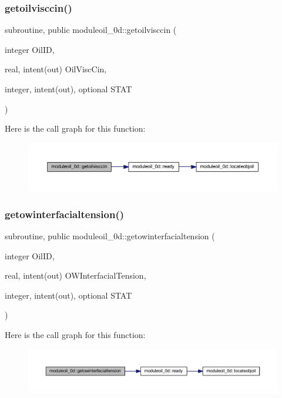 \subsubsection{\texorpdfstring{getoilvisccin()}{getoilvisccin()}}
{\footnotesize\ttfamily subroutine, public moduleoil\+\_\+0d\+::getoilvisccin (\begin{DoxyParamCaption}\item[{integer}]{Oil\+ID,  }\item[{real, intent(out)}]{Oil\+Visc\+Cin,  }\item[{integer, intent(out), optional}]{S\+T\+AT }\end{DoxyParamCaption})}

Here is the call graph for this function\+:\nopagebreak
\begin{figure}[H]
\begin{center}
\leavevmode
\includegraphics[width=350pt]{namespacemoduleoil__0d_a6049ae3704910b8c95b19beb79419be6_cgraph}
\end{center}
\end{figure}
\mbox{\label{namespacemoduleoil__0d_a07a5b422ec6e58c220beb82777c68f30}} 
\subsubsection{\texorpdfstring{getowinterfacialtension()}{getowinterfacialtension()}}
{\footnotesize\ttfamily subroutine, public moduleoil\+\_\+0d\+::getowinterfacialtension (\begin{DoxyParamCaption}\item[{integer}]{Oil\+ID,  }\item[{real, intent(out)}]{O\+W\+Interfacial\+Tension,  }\item[{integer, intent(out), optional}]{S\+T\+AT }\end{DoxyParamCaption})}

Here is the call graph for this function\+:\nopagebreak
\begin{figure}[H]
\begin{center}
\leavevmode
\includegraphics[width=350pt]{namespacemoduleoil__0d_a07a5b422ec6e58c220beb82777c68f30_cgraph}
\end{center}
\end{figure}
\mbox{\label{namespacemoduleoil__0d_af1fa454b03e05f0047dd0b211f889b4b}} 
